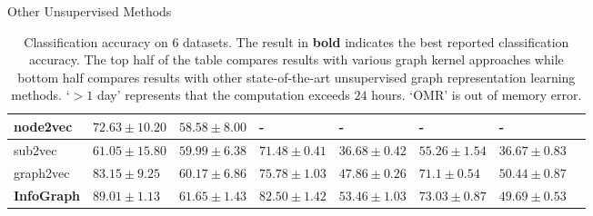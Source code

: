 \documentclass{article} \usepackage{iclr2020_conference,times}
\def\method{InfoGraph}
\begin{document}
\begin{table*}[t!]
    \begin{center}
		Other Unsupervised Methods
	\end{center}
	
	\begin{tabular}{ @{} >{\raggedright}p{2cm} |    K{1.6cm}  !{\vrule width0.8pt} K{1.6cm}  !{\vrule width0.8pt} K{1.6cm} !{\vrule width0.8pt} K{1.6cm}   !{\vrule width0.8pt} K{1.6cm}   !{\vrule width0.8pt}K{1.6cm}   !{\vrule width0.8pt} K{1.6cm} | }	 
		\hline
		node2vec       &  $72.63 \pm 10.20$ & $58.58 \pm 8.00$ & - & - & - & - \\  \hline sub2vec     &$61.05 \pm 15.80$ & $59.99 \pm 6.38$ & $71.48 \pm 0.41$ & $36.68 \pm 0.42$ & $55.26 \pm 1.54$ & $36.67 \pm 0.83$ \\  \hline
		graph2vec  &$83.15 \pm 9.25$ & $60.17 \pm 6.86$ & $75.78 \pm 1.03$ & $47.86 \pm 0.26$ & $71.1 \pm 0.54$ & $\mathbf{50.44 \pm 0.87}$ \\  \hline
		\textbf{\method{}}     &$\mathbf{89.01 \pm 1.13}$ & $61.65 \pm 1.43$ & $\mathbf{82.50 \pm 1.42}$ & $\mathbf{53.46 \pm 1.03}$ & $\mathbf{73.03 \pm 0.87}$ & $49.69 \pm 0.53$
 \\  \hline


\end{tabular}
	

	\caption{Classification accuracy on 6 datasets. The result in \textbf{bold} indicates the  best reported classification accuracy. The top half of the table compares results  with various graph kernel approaches while bottom half compares results with other state-of-the-art unsupervised graph representation learning methods. `$>1$ day' represents that the computation exceeds $24$ hours. `OMR' is out of memory error.} \label{table:results}
	
\end{table*}
 
\end{document}
